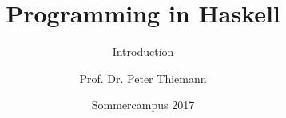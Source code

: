 
\title{Programming in Haskell}
\subtitle{Introduction}

\author[Peter Thiemann]{Prof. Dr. Peter Thiemann}
\date[HaskellKurs]{Sommercampus 2017}


